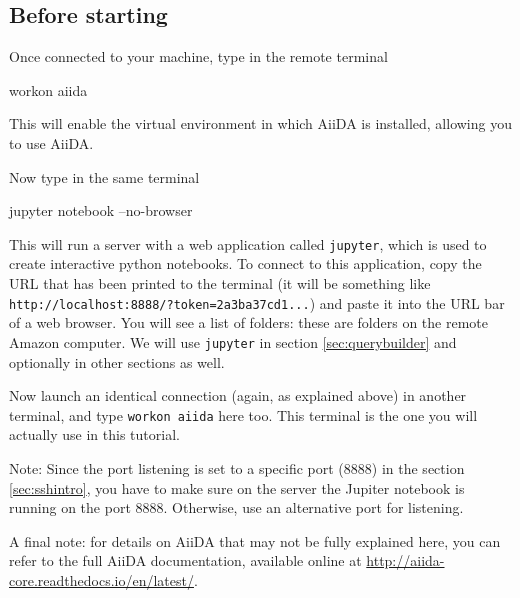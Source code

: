 \subsection*{Before starting}

Once connected to your machine, type in the remote terminal
\begin{bashcommand}
 workon aiida
\end{bashcommand}
This will enable the virtual environment in which AiiDA is installed, allowing you to use AiiDA. %

Now type in the same terminal
\begin{bashcommand}
 jupyter notebook --no-browser
\end{bashcommand}
This will run a server with a web application called \texttt{jupyter}, which is used to create interactive python notebooks. To connect to this application, copy the URL that has been printed to the terminal (it will be something like \texttt{http://localhost:8888/?token=2a3ba37cd1...}) and paste it into the URL bar of a web browser. You will see a list of folders: these are folders on the remote Amazon computer.
We will use \texttt{jupyter} in section \ref{sec:querybuilder} and optionally in other sections as well.

Now launch an identical  connection (again, as explained above) in another terminal, and type \texttt{workon aiida} here too. This terminal is the one you will actually use in this tutorial.

Note: Since the port listening is set to a specific port (8888) in the section \ref{sec:sshintro}, you have to make sure on the server the Jupiter notebook is running on the port 8888. Otherwise, use an alternative port for listening. 


A final note: for details on AiiDA that may not be fully explained here, you can refer to the full AiiDA documentation, available online at \url{http://aiida-core.readthedocs.io/en/latest/}.


